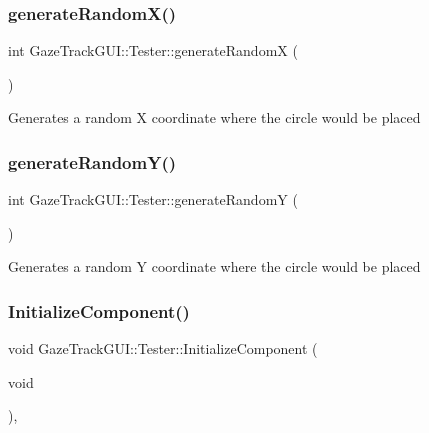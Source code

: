 \subsubsection{\texorpdfstring{generate\+Random\+X()}{generateRandomX()}}
{\footnotesize\ttfamily int Gaze\+Track\+G\+U\+I\+::\+Tester\+::generate\+RandomX (\begin{DoxyParamCaption}{ }\end{DoxyParamCaption})\hspace{0.3cm}{\ttfamily [private]}}

Generates a random X coordinate where the circle would be placed \mbox{\label{class_gaze_track_g_u_i_1_1_tester_af67ef1c7ec226026dfb05f2d7fb8245e}} 
\subsubsection{\texorpdfstring{generate\+Random\+Y()}{generateRandomY()}}
{\footnotesize\ttfamily int Gaze\+Track\+G\+U\+I\+::\+Tester\+::generate\+RandomY (\begin{DoxyParamCaption}{ }\end{DoxyParamCaption})\hspace{0.3cm}{\ttfamily [private]}}

Generates a random Y coordinate where the circle would be placed \mbox{\label{class_gaze_track_g_u_i_1_1_tester_a18f3d904b9d5a2faffb6c2ef4c5c58a3}} 
\subsubsection{\texorpdfstring{Initialize\+Component()}{InitializeComponent()}}
{\footnotesize\ttfamily void Gaze\+Track\+G\+U\+I\+::\+Tester\+::\+Initialize\+Component (\begin{DoxyParamCaption}\item[{void}]{ }\end{DoxyParamCaption})\hspace{0.3cm}{\ttfamily [inline]}, {\ttfamily [private]}}




